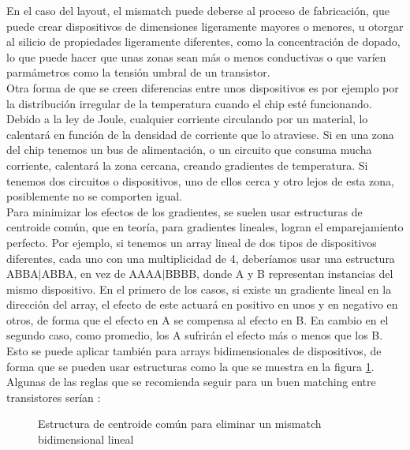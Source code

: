 En el caso del layout, el mismatch puede deberse al proceso de fabricación,
que puede crear dispositivos de dimensiones ligeramente mayores o menores,
u otorgar al silicio de propiedades ligeramente diferentes, como la concentración de
dopado, lo que puede hacer que unas zonas sean más o menos conductivas o que varíen
parmámetros como la tensión umbral de un transistor.\\

Otra forma de que se creen diferencias entre unos dispositivos
es por ejemplo por la distribución irregular
de la temperatura cuando el chip esté funcionando. Debido a la ley de Joule, cualquier
corriente circulando por un material, lo calentará en función de la densidad de corriente
que lo atraviese. Si en una zona del chip tenemos un bus de alimentación, o un circuito
que consuma mucha corriente, calentará la zona cercana, creando gradientes de temperatura.
Si tenemos dos circuitos o dispositivos, uno de ellos cerca y otro lejos de esta zona,
posiblemente no se comporten igual.\\

Para minimizar los efectos de los gradientes, se suelen usar estructuras
de centroide común, que en teoría, para gradientes lineales, logran el emparejamiento
perfecto. Por ejemplo, si tenemos un array lineal de dos tipos de dispositivos diferentes,
cada uno con una multiplicidad de 4, deberíamos usar una estructura ABBA$\vert $ABBA, en vez
de AAAA$\vert $BBBB, donde A y B representan instancias del mismo dispositivo. En el primero
de los casos, si existe un gradiente lineal en la dirección del array, el efecto de este
actuará en positivo en unos y en negativo en otros, de forma que el efecto en A se compensa
al efecto en B. En cambio en el segundo caso, como promedio, los A sufrirán el efecto
más o menos que los B.\\

Esto se puede aplicar también para arrays bidimensionales de dispositivos,
de forma que se pueden usar estructuras como la que se muestra en la figura \ref{fig:centroide_comun}.
Algunas de las reglas que se recomienda seguir para un buen matching entre transistores
serían \cite{Hastings2001}:\\

\begin{figure}[h]
	\centering
	
	\caption[Ejemplo de layout con disposición de centroide común]
	{Estructura de centroide común para eliminar un mismatch bidimensional lineal}
	\label{fig:centroide_comun}
\end{figure}


